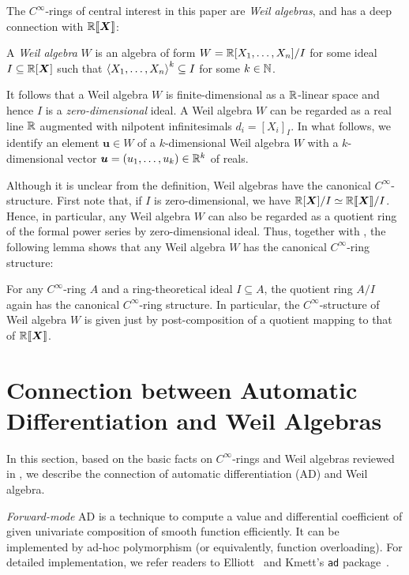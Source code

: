 \documentclass[runningheads]{llncs}
\begin{document}
The $C^\infty$-rings of central interest in this paper are \emph{Weil algebras}, and has a deep connection with $\mathord{\mathbb{R}\llbracket\boldsymbol{X}\rrbracket}$:

\begin{definition}
  A \emph{Weil algebra} $W$ is an algebra of form $W = \mathbb{R}[X_1, \dots, X_n]/I$ for some ideal $I \subseteq \mathbb{R}[\boldsymbol{X}]$ such that $\braket{X_1, \dots, X_n}^k \subseteq I$ for some $k \in \mathbb{N}$.
\end{definition}
It follows that a Weil algebra $W$ is finite-dimensional as a $\mathbb{R}$-linear space and hence $I$ is a \emph{zero-dimensional} ideal.
A Weil algebra $W$ can be regarded as a real line $\mathbb{R}$ augmented with nilpotent infinitesimals $d_i = {[X_i]}_I$.
In what follows, we identify an element $\boldsymbol{u} \in W$ of a $k$-dimensional Weil algebra $W$ with a $k$-dimensional vector $\boldsymbol{u} = (u_1, \dots, u_k) \in \mathbb{R}^k$ of reals.

Although it is unclear from the definition, Weil algebras have the canonical $C^\infty$-structure.
First note that, if $I$ is zero-dimensional, we have $\mathbb{R}[\boldsymbol{X}]/I \simeq \mathbb{R}\llbracket \boldsymbol{X} \rrbracket /I$.
Hence, in particular, any Weil algebra $W$ can also be regarded as a quotient ring of the formal power series by zero-dimensional ideal.
Thus, together with , the following lemma shows that any Weil algebra $W$ has the canonical $C^\infty$-ring structure:

\begin{lemma}[Lawvere]\label{lem:quot-ring-ideal}
  For any $C^\infty$-ring $A$ and a ring-theoretical ideal $I \subseteq A$, the quotient ring $A/I$ again has the canonical $C^\infty$-ring structure.
  In particular, the $C^\infty$-structure of Weil algebra $W$ is given just by post-composition of a quotient mapping to that of $\mathord{\mathbb{R}\llbracket\boldsymbol{X}\rrbracket}$.
\end{lemma}

\section{Connection between Automatic Differentiation and Weil Algebras}
\label{sec:ad-and-weils}
In this section, based on the basic facts on $C^\infty$-rings and Weil algebras reviewed in , we describe the connection of automatic differentiation (AD) and Weil algebra.

\emph{Forward-mode} AD is a technique to compute a value and differential coefficient of given univariate composition of smooth function efficiently.
It can be implemented by ad-hoc polymorphism (or equivalently, function overloading).
For detailed implementation, we refer readers to Elliott~\cite{Elliott2009-beautiful-differentiation} and Kmett's \texttt{ad} package~\cite{Kmett:2010aa}.
\end{document}
